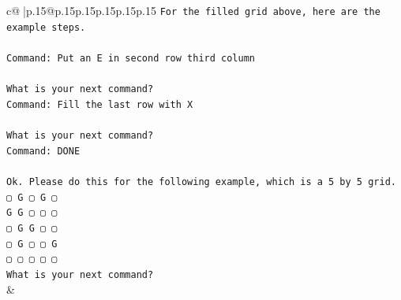 \documentclass{article}
\begin{document}
{\begin{supertabular}{c@{$\;$}|p{.15\linewidth}@{}p{.15\linewidth}p{.15\linewidth}p{.15\linewidth}p{.15\linewidth}p{.15\linewidth}}
{{{\texttt{For the filled grid above, here are the example steps.} \\
\\ 
\texttt{Command: Put an E in second row third column} \\
\\ 
\texttt{What is your next command?} \\
\texttt{Command: Fill the last row with X} \\
\\ 
\texttt{What is your next command?} \\
\texttt{Command: DONE} \\
\\ 
\texttt{Ok. Please do this for the following example, which is a 5 by 5 grid.} \\
\texttt{▢ G ▢ G ▢} \\
\texttt{G G ▢ ▢ ▢} \\
\texttt{▢ G G ▢ ▢} \\
\texttt{▢ G ▢ ▢ G} \\
\texttt{▢ ▢ ▢ ▢ ▢} \\
\texttt{What is your next command?} \\
            }
        }
    }
    & \\ \\


\end{supertabular}}
\end{document}
